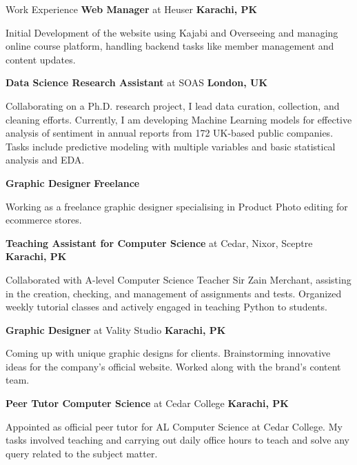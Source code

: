 \begin{rubric}{Work Experience}
%
        \textbf{Web Manager} at Heuser \hfill\textbf{Karachi, PK}
        \par Initial Development of the website using Kajabi and Overseeing and managing online course platform, handling backend tasks like member management and content updates.
        
%
	\textbf{Data Science Research Assistant} at SOAS \hfill\textbf{London, UK}
        \par Collaborating on a Ph.D. research project, I lead data curation, collection, and cleaning efforts. Currently, I am developing Machine Learning models for effective analysis of sentiment in annual reports from 172 UK-based public companies. Tasks include predictive modeling with multiple variables and basic statistical analysis and EDA.
        
%
        \textbf{Graphic Designer} \hfill\textbf{Freelance}
        \par Working as a freelance graphic designer specialising in Product Photo editing for ecommerce stores. 

%
        \textbf{Teaching Assistant for Computer Science} at Cedar, Nixor, Sceptre \hfill\textbf{Karachi, PK}
        \par Collaborated with A-level Computer Science Teacher Sir Zain Merchant, assisting in the creation, checking, and management of assignments and tests. Organized weekly tutorial classes and actively engaged in teaching Python to students.

%
        \textbf{Graphic Designer} at Vality Studio \hfill\textbf{Karachi, PK}
        \par Coming up with unique graphic designs for clients. Brainstorming innovative ideas for the company's official website. Worked along with the brand's content team.

%
        \textbf{Peer Tutor Computer Science} at Cedar College \hfill\textbf{Karachi, PK}
        \par Appointed as official peer tutor for AL Computer Science at Cedar College. My tasks involved teaching and carrying out daily office hours to teach and solve any query related to the subject matter.
        
        
\end{rubric}